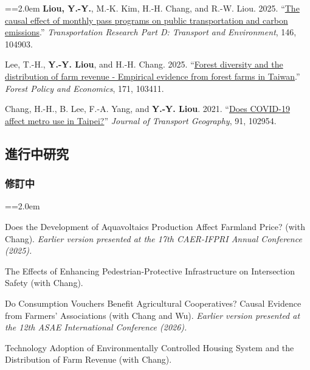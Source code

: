 \documentclass[11pt,letterpaper]{article}
\newenvironment{hanglist}{\par\setlength{\parindent}{0pt}\everypar={\hangindent=2.0em\hangafter=1}}{\par}
\begin{document}
\begin{hanglist}
\textbf{Liou, Y.-Y.}, M.-K. Kim, H.-H. Chang, and
R.-W. Liou. 2025. ``\href{https://doi.org/10.1016/j.trd.2025.104903}{The
causal effect of monthly pass programs on public transportation and
carbon emissions}.'' \emph{Transportation Research Part D: Transport and
Environment}, 146, 104903.

Lee, T.-H., \textbf{Y.-Y. Liou}, and H.-H. Chang.
2025. ``\href{https://doi.org/10.1016/j.forpol.2024.103411}{Forest
diversity and the distribution of farm revenue - Empirical evidence from
forest farms in Taiwan}.'' \emph{Forest Policy and Economics}, 171,
103411.

Chang, H.-H., B. Lee, F.-A. Yang, and
\textbf{Y.-Y. Liou}. 2021.
``\href{https://doi.org/10.1016/j.jtrangeo.2021.102954}{Does COVID-19
affect metro use in Taipei?}'' \emph{Journal of Transport Geography},
91, 102954.

\end{hanglist}

\subsection{\texorpdfstring{\textbf{進行中研究}}{進行中研究}}\label{ux9032ux884cux4e2dux7814ux7a76}

\subsubsection{修訂中}\label{ux4feeux8a02ux4e2d}

\begin{hanglist}

Does the Development of Aquavoltaics Production
Affect Farmland Price? (with Chang).
\newline \textit{Earlier version presented at the 17th CAER-IFPRI Annual Conference (2025).}

The Effects of Enhancing Pedestrian-Protective
Infrastructure on Intersection Safety (with Chang).

Do Consumption Vouchers Benefit Agricultural
Cooperatives? Causal Evidence from Farmers' Associations (with Chang and
Wu).
\newline \textit{Earlier version presented at the 12th ASAE International Conference (2026).}

Technology Adoption of Environmentally Controlled
Housing System and the Distribution of Farm Revenue (with Chang).

\end{hanglist}
\end{document}

